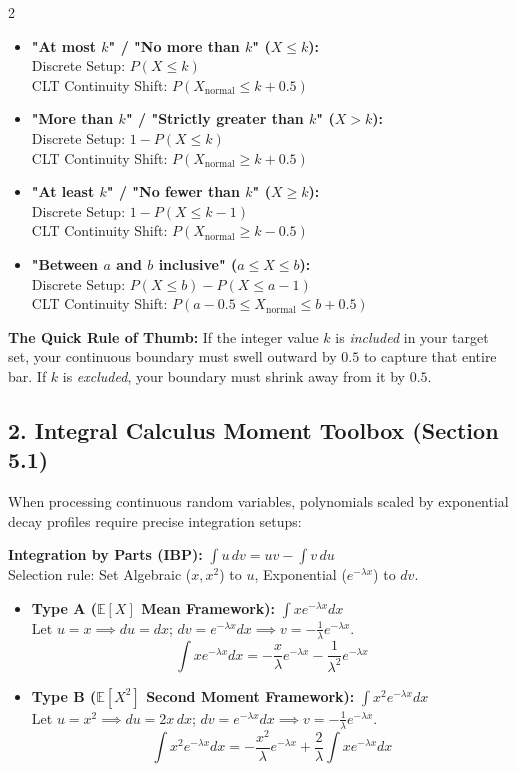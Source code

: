 \documentclass[9pt,landscape]{article}
\newcommand{\E}{\mathbb{E}}
\begin{document}
\begin{multicols*}{2}
\begin{itemize}
    \item \textbf{"At most $k$" / "No more than $k$" ($X \le k$):} \\
    Discrete Setup: $P(X \le k)$ \\
    CLT Continuity Shift: $P(X_{\text{normal}} \le k + 0.5)$
    
    \item \textbf{"More than $k$" / "Strictly greater than $k$" ($X > k$):} \\
    Discrete Setup: $1 - P(X \le k)$ \\
    CLT Continuity Shift: $P(X_{\text{normal}} \ge k + 0.5)$
    
    \item \textbf{"At least $k$" / "No fewer than $k$" ($X \ge k$):} \\
    Discrete Setup: $1 - P(X \le k - 1)$ \\
    CLT Continuity Shift: $P(X_{\text{normal}} \ge k - 0.5)$
    
    \item \textbf{"Between $a$ and $b$ inclusive" ($a \le X \le b$):} \\
    Discrete Setup: $P(X \le b) - P(X \le a - 1)$ \\
    CLT Continuity Shift: $P(a - 0.5 \le X_{\text{normal}} \le b + 0.5)$
\end{itemize}
\textbf{The Quick Rule of Thumb:} If the integer value $k$ is \textit{included} in your target set, your continuous boundary must swell outward by $0.5$ to capture that entire bar. If $k$ is \textit{excluded}, your boundary must shrink away from it by $0.5$.
\subsection*{2. Integral Calculus Moment Toolbox (Section 5.1)}
When processing continuous random variables, polynomials scaled by exponential decay profiles require precise integration setups:

\textbf{Integration by Parts (IBP):} $\int u \, dv = uv - \int v \, du$ \\
Selection rule: Set Algebraic ($x, x^2$) to $u$, Exponential ($e^{-\lambda x}$) to $dv$.
\begin{itemize}
    \item \textbf{Type A ($\E[X]$ Mean Framework):} $\int x e^{-\lambda x} dx$ \\
    Let $u = x \implies du = dx$; $dv = e^{-\lambda x}dx \implies v = -\frac{1}{\lambda}e^{-\lambda x}$.
    $$\int x e^{-\lambda x} dx = -\frac{x}{\lambda}e^{-\lambda x} - \frac{1}{\lambda^2}e^{-\lambda x}$$
    \item \textbf{Type B ($\E[X^2]$ Second Moment Framework):} $\int x^2 e^{-\lambda x} dx$ \\
    Let $u = x^2 \implies du = 2x\,dx$; $dv = e^{-\lambda x}dx \implies v = -\frac{1}{\lambda}e^{-\lambda x}$.
    $$\int x^2 e^{-\lambda x} dx = -\frac{x^2}{\lambda}e^{-\lambda x} + \frac{2}{\lambda}\int x e^{-\lambda x} dx$$
\end{itemize}

\end{multicols*}
\end{document}
